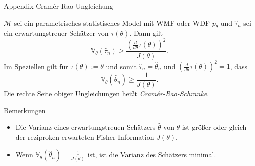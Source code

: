 \documentclass[
  8pt,
  ignorenonframetext,
]{beamer}
\providecommand{\tightlist}{%
  \setlength{\itemsep}{0pt}\setlength{\parskip}{0pt}}
\begin{document}
\begin{frame}{Appendix \textbar{} Cramér-Rao-Ungleichung}
\protect\hypertarget{appendix-cramuxe9r-rao-ungleichung-17}{}
\small
\begin{theorem}
\normalfont
\justifying
$\mathcal{M}$ sei ein parametrisches statistisches Model mit WMF oder
WDF $p_\theta$ und $\hat{\tau}_n$ sei ein erwartungstreuer Schätzer von $\tau(\theta)$.
Dann gilt
\begin{equation}
\mathbb{V}_\theta(\hat{\tau}_n) \ge \frac{\left(\frac{d}{d\theta}\tau(\theta)\right)^2}{J(\theta)}.
\end{equation}
Im Speziellen gilt für $\tau(\theta) := \theta$ und somit $\hat{\tau}_n = \hat{\theta}_n$
und $\left(\frac{d}{d\theta}\tau(\theta)\right)^2 = 1$, dass
\begin{equation}
\mathbb{V}_\theta(\hat{\theta}_n) \ge \frac{1}{J(\theta)}.
\end{equation}
Die rechte Seite obiger Ungleichungen heißt \textit{Cramér-Rao-Schranke}.
\end{theorem}
\footnotesize

Bemerkungen

\begin{itemize}
\tightlist
\item
  Die Varianz eines erwartungstreuen Schätzers \(\hat{\theta}\) von
  \(\theta\) ist größer oder gleich der reziproken erwarteten
  Fisher-Information \(J(\theta)\).
\item
  Wenn \(\mathbb{V}_\theta(\hat{\theta}_n) = \frac{1}{J(\theta)}\) ist,
  ist die Varianz des Schätzers minimal.
\end{itemize}
\end{frame}
\end{document}

